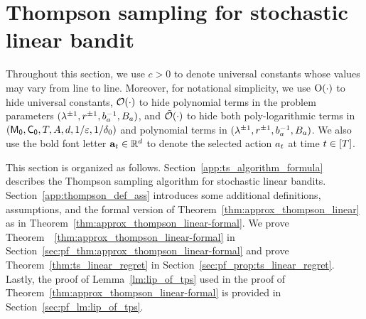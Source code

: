 \section{Thompson sampling for stochastic linear bandit}\label{example:ts-app}

Throughout this section, we use $c>0$ to denote universal constants whose values may vary from line to line.
Moreover, for notational simplicity, we use ${\mathrm{O}}(\cdot)$ to hide universal constants, $\mathcal{O}(\cdot)$ to hide polynomial terms in the problem parameters  $(\lambda^{\pm1},{r}^{\pm1},b_a^{-1},B_a)$, and ${\tilde{\mathcal O}}(\cdot)$ to hide both poly-logarithmic terms in $({\mathsf{M_0}},{{\mathsf{C_0}}},T,A,d,1/\varepsilon,1/\delta_0)$ and polynomial terms in $(\lambda^{\pm1},{r}^{\pm1},b_a^{-1},B_a)$. We also use the bold font letter ${\mathbf a}_t\in\mathbb{R}^d$ to denote the selected action ${a}_t$ at time $t\in[{T}]$.


This section is organized as follows. Section~\ref{app:ts_algorithm_formula} describes the Thompson sampling algorithm for stochastic linear bandits. Section~\ref{app:thompson_def_ass} introduces some additional definitions, assumptions, and the formal version of Theorem~\ref{thm:approx_thompson_linear} as in Theorem~\ref{thm:approx_thompson_linear-formal}.
We prove Theorem~~\ref{thm:approx_thompson_linear-formal} in Section~\ref{sec:pf_thm:approx_thompson_linear-formal} and prove Theorem~\ref{thm:ts_linear_regret} in Section~\ref{sec:pf_prop:ts_linear_regret}. Lastly, the proof of Lemma~\ref{lm:lip_of_tps} used in the proof of Theorem~\ref{thm:approx_thompson_linear-formal} is provided in Section~\ref{sec:pf_lm:lip_of_tps}.



